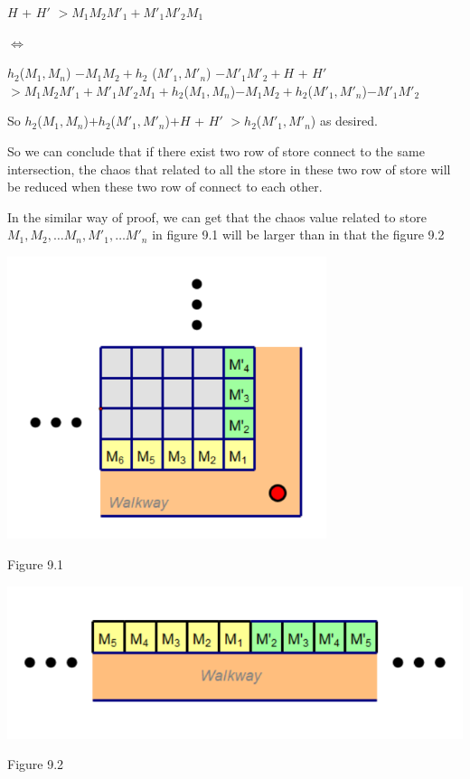 \begin{center}
$H$ + $H'$ $> M_1M_2M'_1+M'_1M'_2M_1$ 
\end{center}
\begin{center}
$\iff$
\end{center}
\begin{center}
$h_2$($M_1,M_n$) $ - M_1M_2+h_2$ ($M'_1,M'_n$) $ - M'_1M'_2+H$ + $H'$ $ > M_1M_2M'_1+M'_1M'_2M_1 + h_2$($M_1,M_n$)$ - M_1M_2+h_2$($M'_1,M'_n$)$ - M'_1M'_2$
\end{center}
\par
So $ h_2$($M_1,M_n$)$ + h_2$($M'_1,M'_n$)$ + H$ + $H'$ $ > h_2$($M'_1,M'_n$) as desired.
\par So we can conclude that if there exist two row of store connect to the same intersection, the chaos that related to all the store in these two row of store will be reduced when these two row of connect to each other. 
\par
In the similar way of proof, we can get that the chaos value related to store $M_1,M_2,\hdots M_n,M'_1,\hdots M'_n$ in figure 9.1 will be larger than in that the figure 9.2

\begin{center}
\includegraphics[width=0.7\textwidth]{fig6.1.PNG}
\end{center}
\begin{center}
Figure 9.1
\end{center}
\begin{center}
\includegraphics[width=\textwidth]{fig6.2.PNG}
\end{center}
\begin{center}
Figure 9.2
\end{center}

